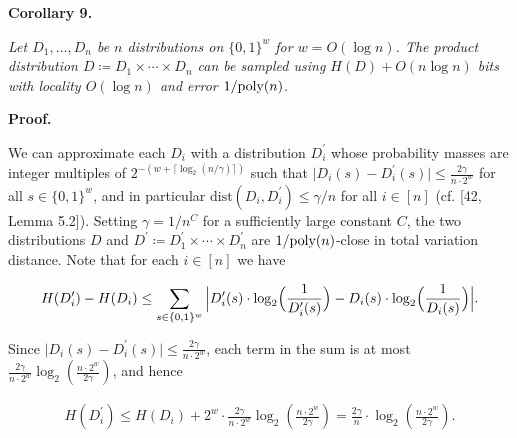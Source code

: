 \documentclass[10pt,a4paper]{article}
\begin{document}


\par\medskip\noindent\textbf{
\textbf{Corollary 9}\textbf{.}
}\par



\emph{Let $D_{1},\ldots,D_{n}$ be $n$ distributions on $\{0,1\}^{w}$ for $w=O(\log n)$.
The product distribution $D\coloneq D_{1}\times\cdots\times D_{n}$ can be sampled using $H(D)+O(n\log n)$ bits with locality $O(\log n)$ and error $1/\textnormal{poly}(n)$.}\par






\par\medskip\noindent\textbf{Proof.}\par




We can approximate each $D_{i}$ with a distribution $D_{i}^{\prime}$ whose probability masses are integer multiples of $2^{-(w+\lceil\log_{2}(n/\gamma)\rceil)}$ such that $\lvert D_{i}(s)-D^{\prime}_{i}(s)\rvert\leq\frac{2\gamma}{n\cdot 2^{w}}$ for all $s\in\{0,1\}^{w}$, and in particular $\mathrm{dist}(D_{i},D^{\prime}_{i})\leq\gamma/n$ for all $i\in[n]$ (cf. [42, Lemma 5.2]).
Setting $\gamma=1/n^{C}$ for a sufficiently large constant $C$, the two distributions $D$ and $D^{\prime}\coloneq D_{1}^{\prime}\times\cdots\times D_{n}^{\prime}$ are $1/\textnormal{poly}(n)$-close in total variation distance.
Note that for each $i\in[n]$ we have\par


\[\begin{gathered}
H(D^{\prime}_{i})-H(D_{i})\leq\sum_{s\in\{0,1\}^{w}}\Big\lvert D^{\prime}_{i}(s)\cdot\log_{2}\Bigl(\frac{1}{D^{\prime}_{i}(s)}\Bigr)-D_{i}(s)\cdot\log_{2}\Bigl(\frac{1}{D_{i}(s)}\Bigr)\Big\rvert.
\end{gathered}\]


Since $\lvert D_{i}(s)-D^{\prime}_{i}(s)\rvert\leq\frac{2\gamma}{n\cdot 2^{w}}$, each term in the sum is at most $\frac{2\gamma}{n\cdot 2^{w}}\log_{2}\left(\frac{n\cdot 2^{w}}{2\gamma}\right)$, and hence\par


\[\begin{gathered}
H(D^{\prime}_{i})\leq H(D_{i})+2^{w}\cdot\frac{2\gamma}{n\cdot 2^{w}}\log_{2}\left(\frac{n\cdot 2^{w}}{2\gamma}\right)=\frac{2\gamma}{n}\cdot\log_{2}\left(\frac{n\cdot 2^{w}}{2\gamma}\right).
\end{gathered}\]
\end{document}

